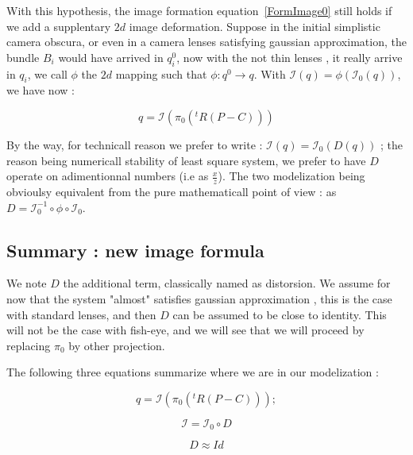 With this hypothesis, the image formation equation~\ref{FormImage0} still holds if
we add a supplentary $2d$ image deformation. Suppose in the initial simplistic camera
obscura, or even in a camera lenses satisfying gaussian approximation, 
the bundle $B_i$ would have arrived in $q^0_i$, now with the not thin lenses ,
it really arrive in $q_i$, we call $\phi$ the $2d$ mapping such that $\phi : q^0 \rightarrow q$.
With $ \mathcal{I}(q) = \phi (\mathcal{I}_0(q))  $, we have now :


\begin{equation}
	q  =   \mathcal{I} (\pi_0 (^t R (P - C)))
\end{equation}

By the way, for technicall reason we prefer to write : $ \mathcal{I}(q) = \mathcal{I}_0(D(q)) $ ; 
the reason being numericall stability of least square system, we prefer to have $D$ operate on adimentionnal numbers
(i.e as $\frac{x}{z}$).  The two modelization being obvioulsy equivalent from the pure mathematicall point of view :
as $D= \mathcal{I}_0^{-1} \circ \phi \circ  \mathcal{I}_0$.


\subsection{Summary : new image formula}

We note $D$ the additional term, classically named as distorsion. We assume for now that the 
system "almost" satisfies gaussian approximation ,  this is the case with standard lenses, 
and then $D$ can be assumed to be close to identity.
This will not be the case with fish-eye, and we will see that we will proceed by replacing $\pi_0$ by other
projection.

The following three equations summarize where we are in our modelization :



\begin{equation}
	q  =   \mathcal{I} (\pi_0 (^t R (P - C))) ; \label{FormImage1}
\end{equation}

\begin{equation}
	\mathcal{I} = \mathcal{I}_0  \circ D \label{FormImage2}
\end{equation}

\begin{equation}
	  D \approx Id \label{FormImage3}
\end{equation}

